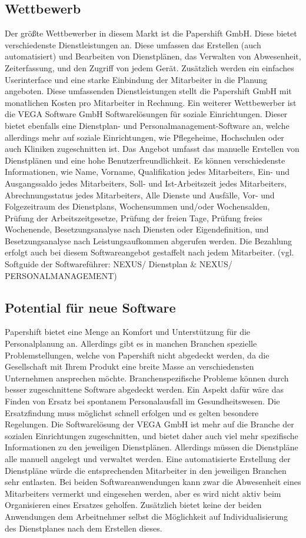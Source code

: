 \documentclass[10pt,a4paper]{article}
\begin{document}
\subsection{Wettbewerb}
Der größte Wettbewerber in diesem Markt ist die Papershift GmbH. Diese bietet verschiedenste Dienstleistungen an. Diese umfassen das Erstellen (auch automatisiert) und Bearbeiten von Dienstplänen, das Verwalten von Abwesenheit, Zeiterfassung, und den Zugriff von jedem Gerät. Zusätzlich werden ein einfaches Userinterface und eine starke Einbindung der Mitarbeiter in die Planung angeboten. Diese umfassenden Dienstleistungen stellt die Papershift GmbH mit monatlichen Kosten pro Mitarbeiter in Rechnung.
Ein weiterer Wettbewerber ist die VEGA Software GmbH Softwarelösungen für soziale Einrichtungen. Dieser bietet ebenfalls eine Dienstplan- und Personalmanagement-Software an, welche allerdings mehr auf soziale Einrichtungen, wie Pflegeheime, Hochschulen oder auch Kliniken zugeschnitten ist. Das Angebot umfasst das manuelle Erstellen von Dienstplänen und eine hohe Benutzerfreundlichkeit. Es können verschiedenste Informationen, wie Name, Vorname, Qualifikation jedes Mitarbeiters, Ein- und Ausgangssaldo jedes Mitarbeiters, Soll- und Ist-Arbeitszeit jedes Mitarbeiters, Abrechnungsstatus jedes Mitarbeiters, Alle Dienste und Ausfälle, Vor- und Folgezeitraum des Dienstplans, Wochensummen und/oder Wochensalden, Prüfung der Arbeitszeitgesetze, Prüfung der freien Tage, Prüfung freies Wochenende, Besetzungsanalyse nach Diensten oder Eigendefinition, und Besetzungsanalyse nach Leistungsaufkommen abgerufen werden. Die Bezahlung erfolgt auch bei diesem Softwareangebot gestaffelt nach jedem Mitarbeiter. (vgl. Softguide der Softwareführer: NEXUS/ Dienstplan & NEXUS/ PERSONALMANAGEMENT)
\subsection{Potential für neue Software}
Papershift bietet eine Menge an Komfort und Unterstützung für die Personalplanung an. Allerdings gibt es in manchen Branchen spezielle Problemstellungen, welche von Papershift nicht abgedeckt werden, da die Gesellschaft mit Ihrem Produkt eine breite Masse an verschiedensten Unternehmen ansprechen möchte. Branchenspezifische Probleme können durch besser zugeschnittene Software abgedeckt werden. Ein Aspekt dafür wäre das Finden von Ersatz bei spontanem Personalausfall im Gesundheitswesen. Die Ersatzfindung muss möglichst schnell erfolgen und es gelten besondere Regelungen.
Die Softwarelösung der VEGA GmbH ist mehr auf die Branche der sozialen Einrichtungen zugeschnitten, und bietet daher auch viel mehr spezifische Informationen zu den jeweiligen Dienstplänen. Allerdings müssen die Dienstpläne alle manuell angelegt und verwaltet werden. Eine automatisierte Erstellung der Dienstpläne würde die entsprechenden Mitarbeiter in den jeweiligen Branchen sehr entlasten.
Bei beiden Softwareanwendungen kann zwar die Abwesenheit eines Mitarbeiters vermerkt und eingesehen werden, aber es wird nicht aktiv beim Organisieren eines Ersatzes geholfen. Zusätzlich bietet keine der beiden Anwendungen dem Arbeitnehmer selbst die Möglichkeit auf Individualisierung des Dienstplanes nach dem Erstellen dieses. 
\end{document}
